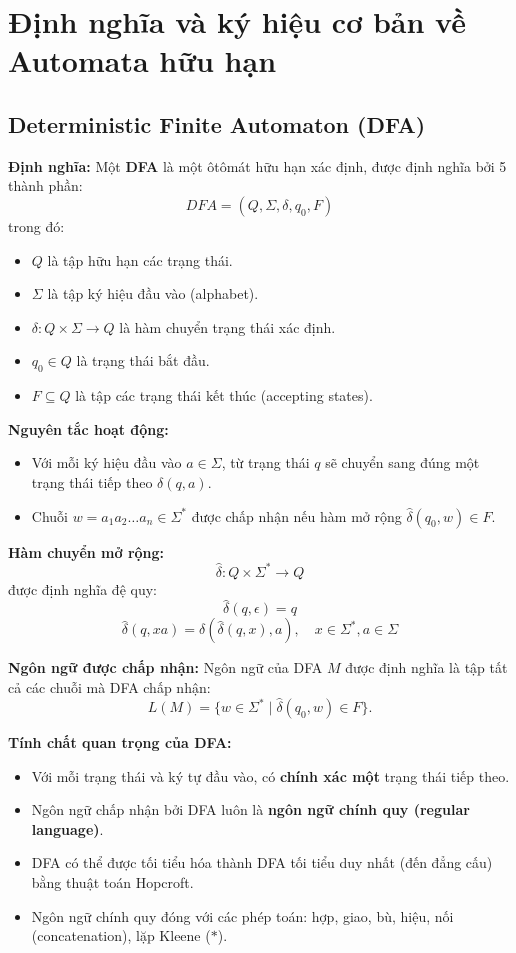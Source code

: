 \documentclass[12pt,a4paper]{report}
\begin{document}
\bigskip

\section{Định nghĩa và ký hiệu cơ bản về Automata hữu hạn}
\subsection{Deterministic Finite Automaton (DFA)}

\textbf{Định nghĩa:}  
Một \textbf{DFA} là một ôtômát hữu hạn xác định, được định nghĩa bởi 5 thành phần:
\[
DFA = (Q, \Sigma, \delta, q_0, F)
\]
trong đó:
\begin{itemize}
    \item $Q$ là tập hữu hạn các trạng thái.
    \item $\Sigma$ là tập ký hiệu đầu vào (alphabet).
    \item $\delta: Q \times \Sigma \rightarrow Q$ là hàm chuyển trạng thái xác định.
    \item $q_0 \in Q$ là trạng thái bắt đầu.
    \item $F \subseteq Q$ là tập các trạng thái kết thúc (accepting states).
\end{itemize}

\textbf{Nguyên tắc hoạt động:}  
\begin{itemize}
    \item Với mỗi ký hiệu đầu vào $a \in \Sigma$, từ trạng thái $q$ sẽ chuyển sang đúng một trạng thái tiếp theo $\delta(q,a)$.
    \item Chuỗi $w = a_1 a_2 \dots a_n \in \Sigma^*$ được chấp nhận nếu hàm mở rộng $\hat{\delta}(q_0, w) \in F$.
\end{itemize}

\textbf{Hàm chuyển mở rộng:}  
\[
\hat{\delta}: Q \times \Sigma^* \rightarrow Q
\]
được định nghĩa đệ quy:
\[
\hat{\delta}(q, \epsilon) = q
\]
\[
\hat{\delta}(q, xa) = \delta(\hat{\delta}(q, x), a), \quad x \in \Sigma^*, a \in \Sigma
\]

\textbf{Ngôn ngữ được chấp nhận:}  
Ngôn ngữ của DFA $M$ được định nghĩa là tập tất cả các chuỗi mà DFA chấp nhận:
\[
L(M) = \{ w \in \Sigma^* \mid \hat{\delta}(q_0, w) \in F \}.
\]

\textbf{Tính chất quan trọng của DFA:}
\begin{itemize}
    \item Với mỗi trạng thái và ký tự đầu vào, có \textbf{chính xác một} trạng thái tiếp theo.
    \item Ngôn ngữ chấp nhận bởi DFA luôn là \textbf{ngôn ngữ chính quy (regular language)}.
    \item DFA có thể được tối tiểu hóa thành DFA tối tiểu duy nhất (đến đẳng cấu) bằng thuật toán Hopcroft.
    \item Ngôn ngữ chính quy đóng với các phép toán: hợp, giao, bù, hiệu, nối (concatenation), lặp Kleene ($*$).
\end{itemize}
\end{document}
